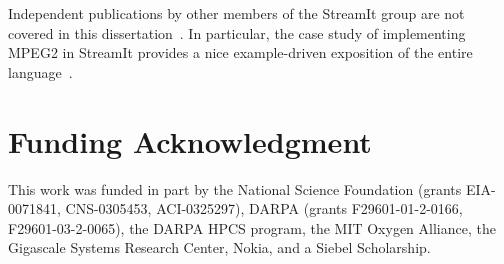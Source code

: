 Independent publications by other members of the StreamIt group are
not covered in this
dissertation~\cite{kuo05,drake-ipdps06,zhang_lightweight_2007}.  In
particular, the case study of implementing MPEG2 in StreamIt provides
a nice example-driven exposition of the entire
language~\cite{drake-ipdps06}.

\section*{Funding Acknowledgment}
This work was funded in part by the National Science Foundation
(grants EIA-0071841, CNS-0305453, ACI-0325297), DARPA (grants
F29601-01-2-0166, F29601-03-2-0065), the DARPA HPCS program, the MIT
Oxygen Alliance, the Gigascale Systems Research Center, Nokia, and a
Siebel Scholarship.
\clearpage

%
%
%
% 
%
%
%
%
%
%
%
%
%
%
%
%
%
